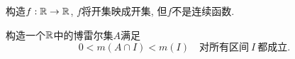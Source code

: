 \begin{exercise}
    构造$f:\mathbb{R} \to \mathbb{R}$, $f$将开集映成开集, 但$f$不是连续函数. 
\end{exercise}




\begin{example}
    构造一个$\mathbb{R}$中的博雷尔集$A$满足
    $$ 0<m(A \cap I)<m(I) \quad \text{对所有区间}~I~\text{都成立}. $$
\end{example}
\begin{solution}


    
\end{solution}

